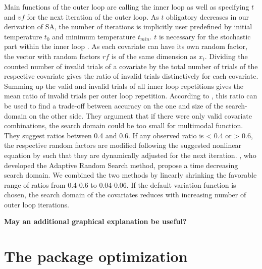 Main functions of the outer loop are calling the inner loop as well as specifying $t$ and $vf$ for the next iteration of the outer loop. As $t$ obligatory decreases in our derivation of SA, the number of iterations is implicitly user predefined by initial temperature $t_0$ and minimum temperature $t_{min}$. $t$ is necessary for the stochastic part within the inner loop \citep{kirkpatrick_1983}. As each covariate can have its own random factor, the vector with random factors $rf$ is of the same dimension as $x_i$. Dividing the counted number of invalid trials of a covariate by the total number of trials of the respective covariate gives the ratio of invalid trials distinctively for each covariate. Summing up the valid and invalid trials of all inner loop repetitions gives the mean ratio of invalid trials per outer loop repetition. According to \citep{corana_1987}, this ratio can be used to find a trade-off between accuracy on the one and size of the search-domain on the other side. They argument that if there were only valid covariate combinations, the search domain could be too small for multimodal function. They suggest ratios between 0.4 and 0.6. If any observed ratio is < 0.4 or > 0.6, the respective random factors are modified following the suggested nonlinear equation by \citet{corana_1987} such that they are dynamically adjusted for the next iteration. \citet{pronzato_1984}, who developed the Adaptive Random Search method, propose a time decreasing search domain. We combined the two methods by linearly shrinking the favorable range of ratios from 0.4-0.6 to 0.04-0.06. If the default variation function is chosen, the search domain of the covariates reduces with increasing number of outer loop iterations.

\textbf{May an additional graphical explanation be useful?}

\section{The package optimization}

